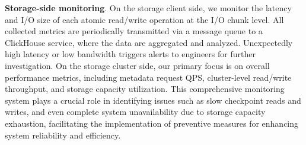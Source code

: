 \noindent \textbf{Storage-side monitoring}.
On the storage client side, we monitor the latency and I/O size of each atomic read/write operation at the I/O chunk level.
All collected metrics are periodically transmitted via a message queue to a ClickHouse service, where the data are aggregated and analyzed.
Unexpectedly high latency or low bandwidth triggers alerts to engineers for further investigation.
On the storage cluster side, our primary focus is on overall performance metrics, including metadata request QPS, cluster-level read/write throughput, and storage capacity utilization.
This comprehensive monitoring system plays a crucial role in identifying issues such as slow checkpoint reads and writes, and even complete system unavailability due to storage capacity exhaustion, facilitating the implementation of preventive measures for enhancing system reliability and efficiency.




